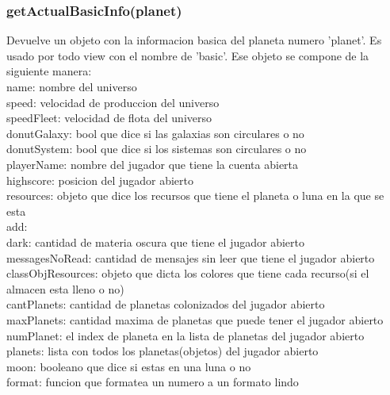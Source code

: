 \documentclass{article}
\newcommand\tab[1][1cm]{\hspace*{#1}}
\begin{document}
        \subsubsection{getActualBasicInfo(planet)}
            Devuelve un objeto con la informacion basica del planeta numero 'planet'. Es usado por todo view con el nombre de 'basic'. Ese objeto se compone de la siguiente manera:\\
            \tab name: nombre del universo\\
            \tab speed: velocidad de produccion del universo\\
            \tab speedFleet: velocidad de flota del universo\\
            \tab donutGalaxy: bool que dice si las galaxias son circulares o no\\
            \tab donutSystem: bool que dice si los sistemas son circulares o no\\
            \tab playerName: nombre del jugador que tiene la cuenta abierta\\
            \tab highscore: posicion del jugador abierto\\
            \tab resources: objeto que dice los recursos que tiene el planeta o luna en la que se esta\\
            \tab add: \\
            \tab dark: cantidad de materia oscura que tiene el jugador abierto\\
            \tab messagesNoRead: cantidad de mensajes sin leer que tiene el jugador abierto\\
            \tab classObjResources: objeto que dicta los colores que tiene cada recurso(si el almacen esta lleno o no)\\
            \tab cantPlanets: cantidad de planetas colonizados del jugador abierto\\
            \tab maxPlanets: cantidad maxima de planetas que puede tener el jugador abierto\\
            \tab numPlanet: el index de planeta en la lista de planetas del jugador abierto\\
            \tab planets: lista con todos los planetas(objetos) del jugador abierto\\
            \tab moon: booleano que dice si estas en una luna o no\\
            \tab format: funcion que formatea un numero a un formato lindo\\
\end{document}
